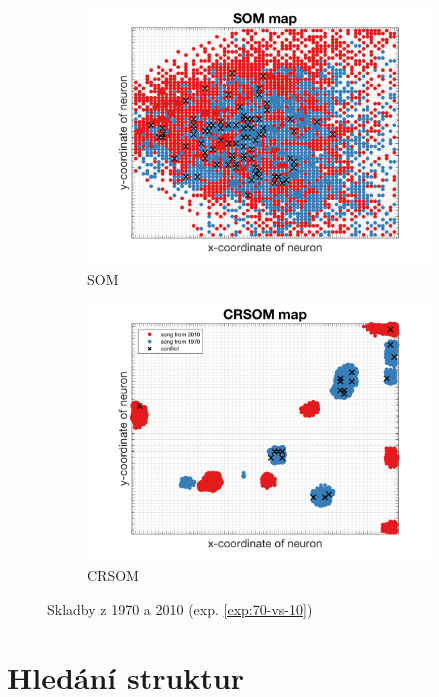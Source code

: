 \documentclass[thesis=M,czech]{FITthesis}[2012/06/26]
\begin{document}
\begin{figure}
\centering
\begin{subfigure}{.5\textwidth}
  \centering
  \includegraphics[width=.99\linewidth]{exp_70s10s_som.png}
  \caption{SOM}
  \label{fig:sub1}
\end{subfigure}%
\begin{subfigure}{.5\textwidth}
  \centering
  \includegraphics[width=.99\linewidth]{exp_70s10s_crsom.png}
  \caption{CRSOM}
  \label{fig:sub2}
\end{subfigure}
\caption{Skladby z 1970 a 2010 (exp. \ref{exp:70-vs-10})}
\label{fig:top}
\end{figure}



\section{Hledání struktur}
\end{document}
